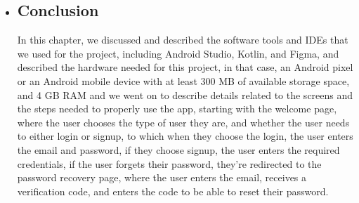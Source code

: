 \documentclass{article}
\begin{document}
\begin{itemize}
\item \subsection{Conclusion}
In this chapter, we discussed and described the software tools and IDEs that we used for the project, including Android Studio, Kotlin, and Figma, and described the hardware needed for this project, in that case, an Android pixel or an Android mobile device with at least 300 MB of available storage space, and 4 GB RAM and we went on to describe details related to the screens and the steps needed to properly use the app, starting with the welcome page, where the user chooses the type of user they are, and whether the user needs to either login or signup, to which when they choose the login, the user enters the email and password, if they choose signup, the user enters the required credentials, if the user forgets their password, they're redirected to the password recovery page, where the user enters the email, receives a verification code, and enters the code to be able to reset their password.
\end{itemize}
\end{document}
